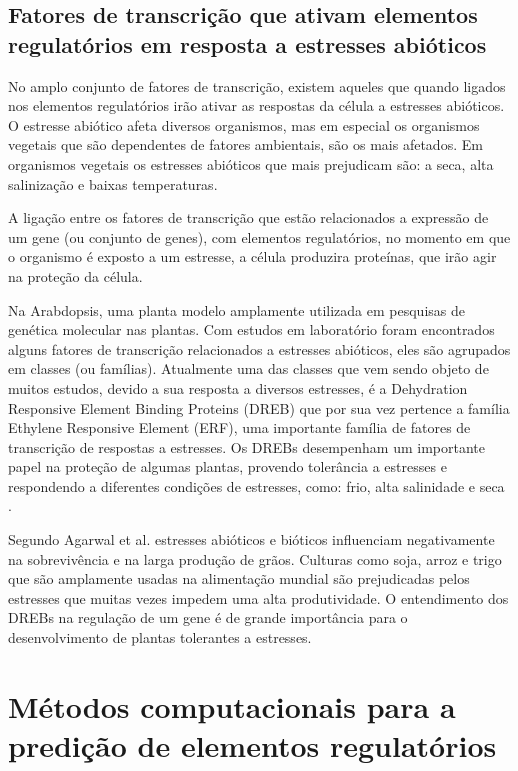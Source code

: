 \subsection{Fatores de transcrição que ativam elementos regulatórios em resposta a estresses abióticos}

No amplo conjunto de fatores de transcrição, existem aqueles que quando ligados nos elementos regulatórios irão ativar as respostas da célula a estresses abióticos. O estresse abiótico afeta diversos organismos, mas em especial os organismos vegetais que são dependentes de fatores ambientais, são os mais afetados. Em organismos vegetais os estresses abióticos que mais prejudicam são: a seca, alta salinização e baixas temperaturas.

A ligação entre os fatores de transcrição que estão relacionados a expressão de um gene (ou conjunto de genes), com elementos regulatórios, no momento em que o organismo é exposto a um estresse, a célula produzira proteínas, que irão agir na proteção da célula.

Na Arabdopsis, uma planta modelo amplamente utilizada em pesquisas de genética molecular nas plantas. Com estudos em laboratório foram encontrados alguns fatores de transcrição relacionados a estresses abióticos, eles são agrupados em classes (ou famílias). Atualmente uma das classes que vem sendo objeto de muitos estudos, devido a sua resposta a diversos estresses, é a Dehydration Responsive Element Binding Proteins (DREB) que por sua vez pertence a família Ethylene Responsive Element (ERF), uma importante família de fatores de transcrição de respostas a estresses. Os DREBs desempenham um importante papel na proteção de algumas plantas, provendo tolerância a estresses e respondendo a diferentes condições de estresses, como: frio, alta salinidade e seca \cite{Agarwal2006}.

Segundo Agarwal et al.\cite{Agarwal2006} estresses abióticos e bióticos influenciam negativamente na sobrevivência e na larga produção de grãos. Culturas como soja, arroz e trigo que são amplamente usadas na alimentação mundial são prejudicadas pelos estresses que muitas vezes impedem uma alta produtividade. O entendimento dos DREBs na regulação de um gene é de grande importância para o desenvolvimento de plantas tolerantes a estresses.

\section{Métodos computacionais para a predição de elementos regulatórios}

